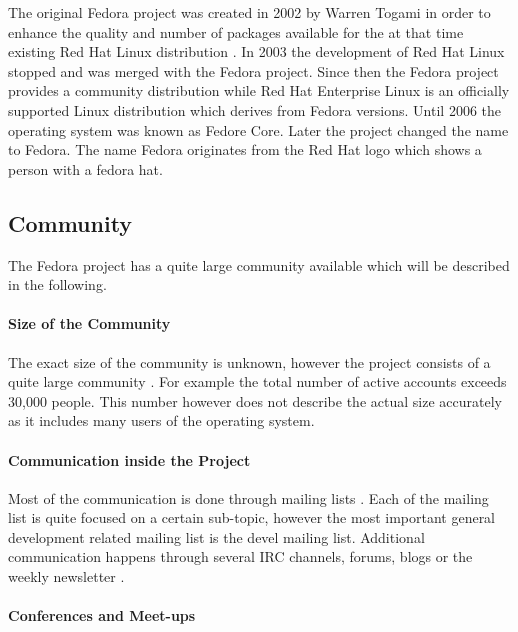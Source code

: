 The original Fedora project was created in 2002 by Warren Togami in order to
enhance the quality and number of packages available for the at that time
existing Red Hat Linux distribution
\cite{FedoraAbout,FedoraTogami,FedoraHistoricalSchedules}. In 2003 the
development of Red Hat Linux stopped and was merged with the Fedora project.
Since then the Fedora project provides a community distribution while Red Hat
Enterprise Linux is an officially supported Linux distribution which derives
from Fedora versions. Until 2006 the operating system was known as Fedore Core.
Later the project changed the name to Fedora. The name Fedora originates from
the Red Hat logo which shows a person with a fedora hat.

\subsection{Community}

The Fedora project has a quite large community available which will be
described in the following.

\paragraph{Size of the Community}

The exact size of the community is unknown, however the project consists of a
quite large community \cite{FedoraStatistics}. For example the total number of
active accounts exceeds 30,000 people. This number however does not describe
the actual size accurately as it includes many users of the operating system.

\paragraph{Communication inside the Project}

Most of the communication is done through mailing lists
\cite{FedoraAbout,FedoraJoin,FedoraSIG}. Each of the mailing list is quite
focused on a certain sub-topic, however the most important general development
related mailing list is the devel mailing list. Additional communication
happens through several \ac{IRC} channels, forums, blogs or the weekly
newsletter \cite{FedoraFWN,FedoraCommunicating}.

\paragraph{Conferences and Meet-ups}

